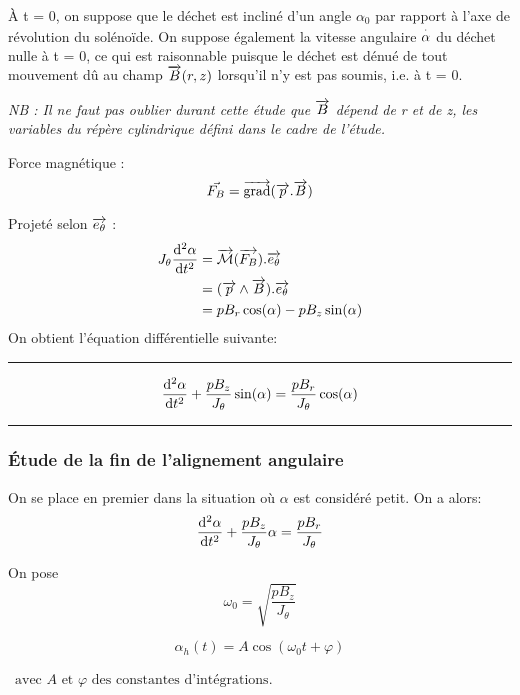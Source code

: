 \documentclass{report}
\begin{document}

À t = 0, on suppose que le déchet est incliné d'un angle $\alpha_0$ par rapport à l'axe de révolution du solénoïde. On suppose également la vitesse angulaire $\overset{\cdot}{\alpha}$ du déchet nulle à t = 0, ce qui est raisonnable puisque le déchet est dénué de tout mouvement dû au champ $\overrightarrow{B}(r,z)$ lorsqu'il n'y est pas soumis, i.e. à t = 0.


\emph{NB : Il ne faut pas oublier durant cette étude que $\overrightarrow{B}$ dépend de r et de z, les variables du répère cylindrique défini dans le cadre de l'étude.}

Force magnétique :
$$\vec{F_B} = \overrightarrow{\text{grad}}(\overrightarrow{p}.\overrightarrow{B})$$


Projeté selon $\overrightarrow{e_\theta}$ :
\begin{align*}
J_\theta \frac{\mathrm{d^2}\alpha}{\mathrm{d}t^2} &= \overrightarrow{\mathcal{M}}(\overrightarrow{F_B}) . \overrightarrow{e_\theta} \\
&= (\overrightarrow{p} \wedge \overrightarrow{B}).\overrightarrow{e_\theta}\\
&= pB_r \cos(\alpha) - pB_z\sin(\alpha)
\end{align*}
\newpage
On obtient l'équation différentielle suivante:

\rule{\textwidth}{0.4pt}
\begin{center}
$$\frac{\mathrm{d^2}\alpha}{\mathrm{d}t^2} + \frac{pB_z}{J_\theta}\sin(\alpha) = \frac{pB_r}{J_\theta} \cos(\alpha)$$    
\end{center}

\rule{\textwidth}{0.4pt}

\subsubsection{Étude de la fin de l'alignement angulaire}
On se place en premier dans la situation où $\alpha$ est considéré petit. On a alors:
$$\frac{\mathrm{d^2}\alpha}{\mathrm{d}t^2} + \frac{pB_z}{J_\theta}\alpha = \frac{pB_r}{J_\theta} $$

On pose $$\omega_0 = \sqrt{\frac{pB_z}{J_\theta}}$$


$$\alpha_h(t) = A \cos(\omega_0 t + \varphi)$$

$\, \text{ avec } A \text{ et } \varphi \text{ des constantes d'intégrations}$.
\end{document}
